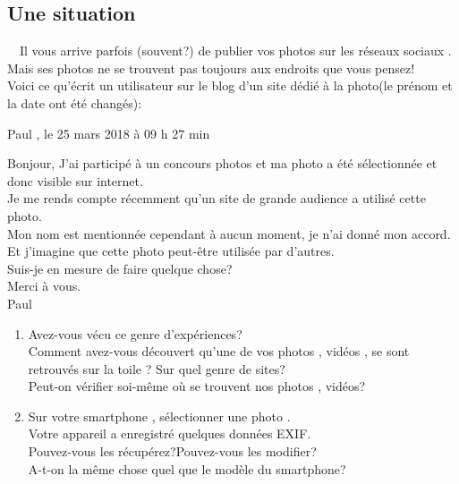 \documentclass[10pt,fleqn]{article} %
\begin{document}
\subsection{Une situation}

\RIGHTarrow ~~Il vous arrive parfois (souvent?) de publier vos photos sur les réseaux sociaux .\\
Mais ses photos ne se trouvent pas toujours aux endroits que vous pensez!\\
Voici ce qu'écrit un utilisateur sur le blog d'un site dédié à la photo(le prénom et la date ont été changés):

\begin{tcolorbox}[colframe =
	orange, colback = orange!50,width=17cm,
	boxrule = 2pt, arc = 6pt,
	title = {}, coltitle
	= black]
	\vspace{0.3cm}
	
	Paul ,	le 25 mars 2018 à 09 h 27 min
	
	\medskip
	
	
	Bonjour,
	J’ai participé à un concours photos et ma photo a été sélectionnée et donc visible sur internet.\\
	Je me rends compte récemment qu’un site de grande audience a utilisé cette photo.\\
	Mon nom est mentionnée cependant à aucun moment, je n’ai donné mon accord. Et j’imagine que cette photo peut-être utilisée par d’autres.\\
	Suis-je en mesure de faire quelque chose?\\
	Merci à vous.\\
	Paul
\end{tcolorbox}

\begin{enumerate}
	\item 
	
	
	Avez-vous vécu ce genre d'expériences?\\
	Comment avez-vous découvert qu'une de vos photos , vidéos , se sont retrouvés sur la toile ? Sur quel genre de sites?\\
	Peut-on vérifier soi-même où se trouvent nos photos , vidéos?
	
	
	
	
	\item
	
	Sur votre smartphone , sélectionner une photo .\\
	Votre appareil a enregistré quelques données EXIF.\\
	Pouvez-vous les récupérez?Pouvez-vous les modifier?\\
	A-t-on la même chose quel que le modèle du smartphone?
\end{enumerate}
\end{document}
